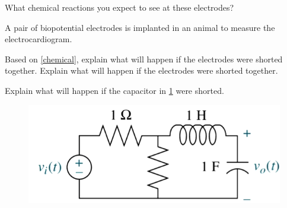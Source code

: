\question

\listbeginx	%
	\item \label{chemical} What chemical reactions you expect to see at these electrodes? 
	
	
	
	\item A pair of biopotential electrodes is implanted in an animal to measure the electrocardiogram.
	

	\listbegin	%
		\item Based on \ref{chemical}, explain what will happen if the electrodes were shorted together. Explain what will happen if the electrodes were shorted together. 
		
		
	\listclose %
	
	\item Explain what will happen if the capacitor in \cref{fig:meshcircuit} were shorted. 
	
	
		
	\begin{figure}[H] %
		\centering
		\includegraphics{testfig}
		\caption{\rajah}
		\label{fig:meshcircuit}
	\end{figure}

